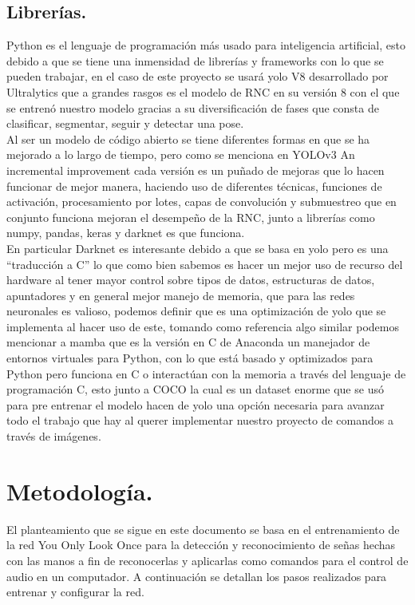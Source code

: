 \documentclass[a4paper, 12pt]{article}
\begin{document}
    \subsection{Librerías.}
    Python es el lenguaje de programación más usado para inteligencia artificial, esto debido a que se tiene una inmensidad de librerías y frameworks con lo que se pueden trabajar, en el caso de este proyecto se usará yolo V8 desarrollado por Ultralytics que a grandes rasgos es el modelo de RNC en su versión 8 con el que se entrenó nuestro modelo gracias a su diversificación de fases que consta de clasificar, segmentar, seguir y detectar una pose.\\ 
    Al ser un modelo de código abierto se tiene diferentes formas en que se ha mejorado a lo largo de tiempo, pero como se menciona en YOLOv3 An incremental improvement\cite{redmon2018yolov3} cada versión es un puñado de mejoras que lo hacen funcionar de mejor manera, haciendo uso de diferentes técnicas, funciones de activación, procesamiento por lotes, capas de convolución y submuestreo que en conjunto funciona mejoran el desempeño de la RNC, junto a librerías como numpy, pandas, keras y darknet es que funciona.\\ 
    En particular Darknet es interesante debido a que se basa en yolo pero es una “traducción a C” lo que como bien sabemos es hacer un mejor uso de recurso del hardware al tener mayor control sobre tipos de datos, estructuras de datos, apuntadores y en general mejor manejo de memoria, que para las redes neuronales es valioso, podemos definir que es una optimización de yolo que se implementa al hacer uso de este, tomando como referencia algo similar podemos mencionar a mamba que es la versión en C de Anaconda un manejador de entornos virtuales para Python, con lo que está basado y optimizados para Python pero funciona en C o interactúan con  la memoria a través del lenguaje de programación C, esto junto a COCO la cual es un dataset enorme que se usó para pre entrenar el modelo hacen de yolo una opción necesaria para avanzar todo el trabajo que hay al querer implementar nuestro proyecto de comandos a través de imágenes. 
    

    \section{Metodología.}
    El planteamiento que se sigue en este documento se basa en el entrenamiento de la red You Only Look Once para la detección y reconocimiento de señas hechas con las manos a fin de reconocerlas y aplicarlas como comandos para el control de audio en un computador. A continuación se detallan los pasos realizados para entrenar y configurar la red.
\end{document}

